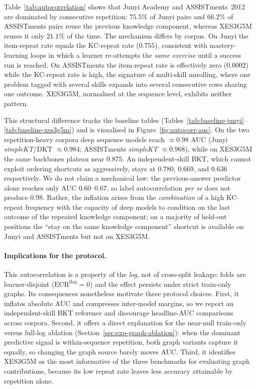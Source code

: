 \documentclass[runningheads]{llncs}
\newcommand{\KC}{knowledge component}
\begin{document}
Table~\ref{tab:autocorrelation} shows that Junyi Academy and ASSISTments~2012
are dominated by consecutive repetition: $75.5\%$ of Junyi pairs and $66.2\%$
of ASSISTments pairs reuse the previous \KC{}, whereas XES3G5M reuses it only
$21.1\%$ of the time. The mechanism differs by corpus. On Junyi the item-repeat
rate equals the KC-repeat rate ($0.755$), consistent with mastery-learning loops
in which a learner re-attempts the \emph{same exercise} until a success run is
reached. On ASSISTments the item-repeat rate is effectively zero ($0.0002$) while
the KC-repeat rate is high, the signature of multi-skill unrolling, where one
problem tagged with several skills expands into several consecutive rows sharing
one outcome. XES3G5M, normalised at the sequence level, exhibits neither pattern.

This structural difference tracks the baseline tables
(Tables~\ref{tab:baseline-junyi}--\ref{tab:baseline-xes3g5m}) and is
visualised in Figure~\ref{fig:autocorr-auc}. On the two
repetition-heavy corpora deep sequence models reach ${\approx}0.98$ AUC (Junyi
\textit{simpleKT}/DKT ${\approx}0.984$; ASSISTments \textit{simpleKT}
${\approx}0.968$), while on XES3G5M the same backbones plateau near $0.875$. An
independent-skill BKT, which cannot exploit ordering shortcuts as aggressively,
stays at $0.780$, $0.669$, and $0.636$ respectively. We do not claim a
mechanical law: the previous-answer predictor alone reaches only AUC
$0.60$--$0.67$, so label autocorrelation \emph{per se} does not produce $0.98$.
Rather, the inflation arises from the \emph{combination} of a high KC-repeat
frequency with the capacity of deep models to condition on the last outcome of
the repeated \KC{}; on a majority of held-out positions the ``stay on the same
\KC{}'' shortcut is available on Junyi and ASSISTments but not on XES3G5M.

\paragraph{Implications for the protocol.}
This autocorrelation is a property of the \emph{log}, not of cross-split
leakage: folds are learner-disjoint ($\mathrm{ECR}^{\mathrm{flag}}{=}0$) and the
effect persists under strict train-only graphs. Its consequences nonetheless
motivate three protocol choices. First, it inflates absolute AUC and compresses
inter-model margins, so we report an independent-skill BKT reference and
discourage headline-AUC comparisons across corpora. Second, it offers a direct
explanation for the near-null train-only versus full-log ablation
(Section~\ref{sec:exp-graph-ablation}): when the dominant predictive signal is
within-sequence repetition, both graph variants capture it equally, so changing
the graph source barely moves AUC. Third, it identifies XES3G5M as the most
informative of the three benchmarks for evaluating graph contributions, because
its low repeat rate leaves less accuracy attainable by repetition alone.
\end{document}

